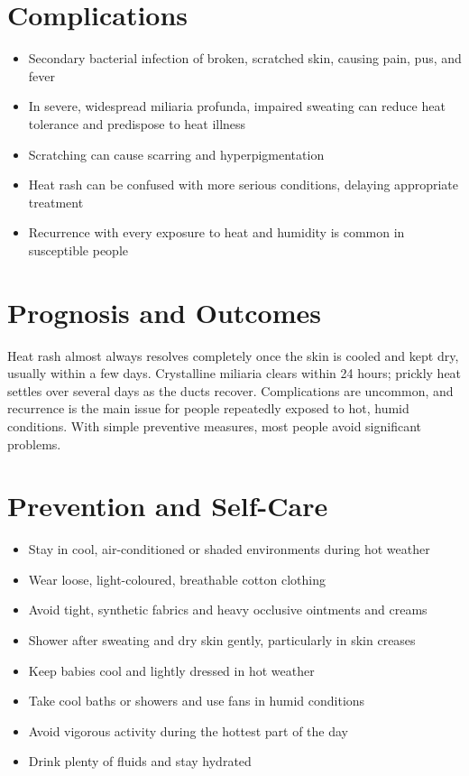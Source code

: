 \section*{Complications}
\begin{itemize}
    \item Secondary bacterial infection of broken, scratched skin, causing pain, pus, and fever
    \item In severe, widespread miliaria profunda, impaired sweating can reduce heat tolerance and predispose to heat illness
    \item Scratching can cause scarring and hyperpigmentation
    \item Heat rash can be confused with more serious conditions, delaying appropriate treatment
    \item Recurrence with every exposure to heat and humidity is common in susceptible people
\end{itemize}

\section*{Prognosis and Outcomes}
Heat rash almost always resolves completely once the skin is cooled and kept dry, usually within a few days. Crystalline miliaria clears within 24 hours; prickly heat settles over several days as the ducts recover. Complications are uncommon, and recurrence is the main issue for people repeatedly exposed to hot, humid conditions. With simple preventive measures, most people avoid significant problems.

\section*{Prevention and Self-Care}
\begin{itemize}
    \item Stay in cool, air-conditioned or shaded environments during hot weather
    \item Wear loose, light-coloured, breathable cotton clothing
    \item Avoid tight, synthetic fabrics and heavy occlusive ointments and creams
    \item Shower after sweating and dry skin gently, particularly in skin creases
    \item Keep babies cool and lightly dressed in hot weather
    \item Take cool baths or showers and use fans in humid conditions
    \item Avoid vigorous activity during the hottest part of the day
    \item Drink plenty of fluids and stay hydrated
\end{itemize}

